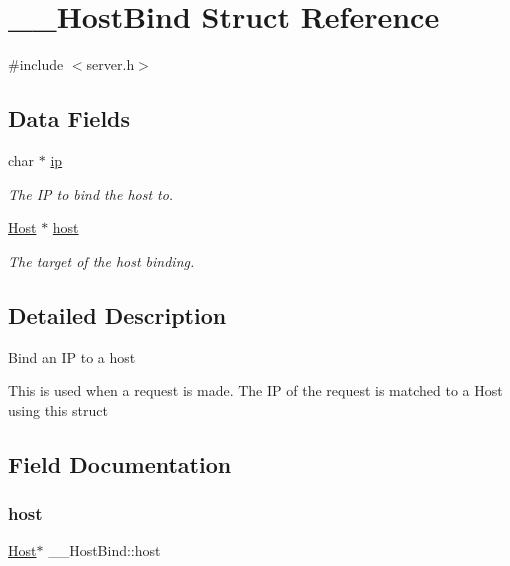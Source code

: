 \hypertarget{struct_____host_bind}{}\section{\+\_\+\+\_\+\+Host\+Bind Struct Reference}
\label{struct_____host_bind}


{\ttfamily \#include $<$server.\+h$>$}

\subsection*{Data Fields}
\begin{DoxyCompactItemize}
\item 
char $\ast$ \mbox{\hyperlink{struct_____host_bind_adb22dedfee930d080c8acea30d3393c6}{ip}}
\begin{DoxyCompactList}\small\item\em The IP to bind the host to. \end{DoxyCompactList}\item 
\mbox{\hyperlink{host_8h_a30ca67c0ed1f344be0c570271ecfc489}{Host}} $\ast$ \mbox{\hyperlink{struct_____host_bind_af6e9dd06a9acd289d27429f53b8bace6}{host}}
\begin{DoxyCompactList}\small\item\em The target of the host binding. \end{DoxyCompactList}\end{DoxyCompactItemize}


\subsection{Detailed Description}
Bind an IP to a host

This is used when a request is made. The IP of the request is matched to a Host using this struct 

\subsection{Field Documentation}
\mbox{\label{struct_____host_bind_af6e9dd06a9acd289d27429f53b8bace6}} 
\subsubsection{\texorpdfstring{host}{host}}
{\footnotesize\ttfamily \mbox{\hyperlink{host_8h_a30ca67c0ed1f344be0c570271ecfc489}{Host}}$\ast$ \+\_\+\+\_\+\+Host\+Bind\+::host}



